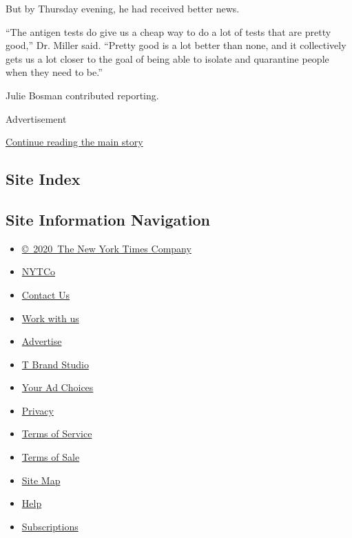 But by Thursday evening, he had received better news.

``The antigen tests do give us a cheap way to do a lot of tests that are
pretty good,'' Dr. Miller said. ``Pretty good is a lot better than none,
and it collectively gets us a lot closer to the goal of being able to
isolate and quarantine people when they need to be.''

Julie Bosman contributed reporting.

Advertisement

\protect\hyperlink{after-bottom}{Continue reading the main story}

\hypertarget{site-index}{%
\subsection{Site Index}\label{site-index}}

\hypertarget{site-information-navigation}{%
\subsection{Site Information
Navigation}\label{site-information-navigation}}

\begin{itemize}
\tightlist
\item
  \href{https://help.nytimes.com/hc/en-us/articles/115014792127-Copyright-notice}{©~2020~The
  New York Times Company}
\end{itemize}

\begin{itemize}
\tightlist
\item
  \href{https://www.nytco.com/}{NYTCo}
\item
  \href{https://help.nytimes.com/hc/en-us/articles/115015385887-Contact-Us}{Contact
  Us}
\item
  \href{https://www.nytco.com/careers/}{Work with us}
\item
  \href{https://nytmediakit.com/}{Advertise}
\item
  \href{http://www.tbrandstudio.com/}{T Brand Studio}
\item
  \href{https://www.nytimes.com/privacy/cookie-policy\#how-do-i-manage-trackers}{Your
  Ad Choices}
\item
  \href{https://www.nytimes.com/privacy}{Privacy}
\item
  \href{https://help.nytimes.com/hc/en-us/articles/115014893428-Terms-of-service}{Terms
  of Service}
\item
  \href{https://help.nytimes.com/hc/en-us/articles/115014893968-Terms-of-sale}{Terms
  of Sale}
\item
  \href{https://spiderbites.nytimes.com}{Site Map}
\item
  \href{https://help.nytimes.com/hc/en-us}{Help}
\item
  \href{https://www.nytimes.com/subscription?campaignId=37WXW}{Subscriptions}
\end{itemize}
